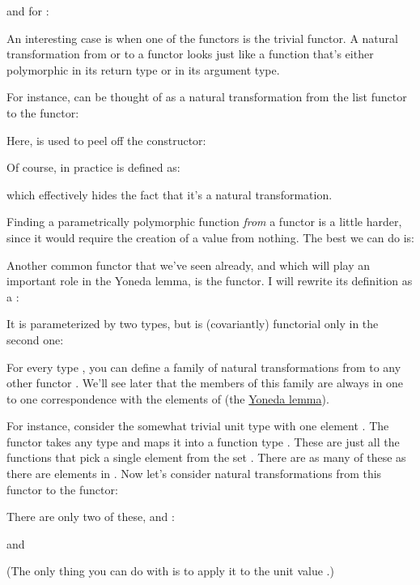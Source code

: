 and for :

An interesting case is when one of the functors is the trivial
 functor. A natural transformation from or to a
 functor looks just like a function that's either
polymorphic in its return type or in its argument type.

For instance,  can be thought of as a natural
transformation from the list functor to the  functor:

Here,  is used to peel off the 
constructor:

Of course, in practice  is defined as:

which effectively hides the fact that it's a natural transformation.

Finding a parametrically polymorphic function \emph{from} a
 functor is a little harder, since it would require the
creation of a value from nothing. The best we can do is:

Another common functor that we've seen already, and which will play an
important role in the Yoneda lemma, is the  functor. I
will rewrite its definition as a :

It is parameterized by two types, but is (covariantly) functorial only
in the second one:

For every type , you can define a family of natural
transformations from  to any other functor .
We'll see later that the members of this family are always in one to one
correspondence with the elements of  (the
\hyperref[the-yoneda-lemma]{Yoneda lemma}).

For instance, consider the somewhat trivial unit type \code{()} with
one element \code{()}. The functor  takes any type
 and maps it into a function type .
These are just all the functions that pick a single element from the set
. There are as many of these as there are elements in
. Now let's consider natural transformations from this functor
to the  functor:

There are only two of these,  and :

and

(The only thing you can do with  is to apply it to the unit
value \code{()}.)


